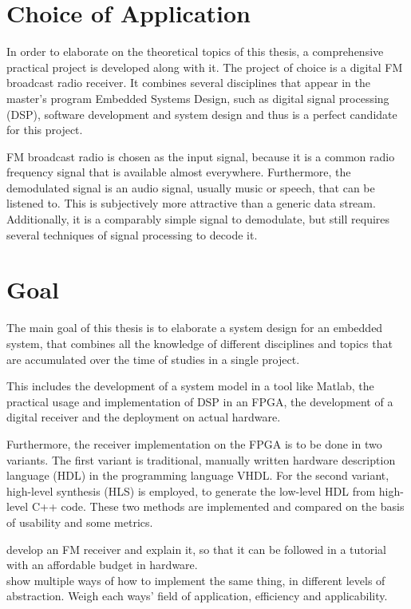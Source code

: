 \section{Choice of Application}

In order to elaborate on the theoretical topics of this thesis, a comprehensive practical project is developed along with it.
The project of choice is a digital FM broadcast radio receiver.
It combines several disciplines that appear in the master's program Embedded Systems Design, such as digital signal processing (DSP), software development and system design and thus is a perfect candidate for this project.

FM broadcast radio is chosen as the input signal, because it is a common radio frequency signal that is available almost everywhere.
Furthermore, the demodulated signal is an audio signal, usually music or speech, that can be listened to.
This is subjectively more attractive than a generic data stream.
Additionally, it is a comparably simple signal to demodulate, but still requires several techniques of signal processing to decode it.

\section{Goal}

The main goal of this thesis is to elaborate a system design for an embedded system, that combines all the knowledge of different disciplines and topics that are accumulated over the time of studies in a single project.

This includes the development of a system model in a tool like Matlab, the practical usage and implementation of DSP in an FPGA, the development of a digital receiver and the deployment on actual hardware.

Furthermore, the receiver implementation on the FPGA is to be done in two variants.
The first variant is traditional, manually written hardware description language (HDL) in the programming language VHDL.
For the second variant, high-level synthesis (HLS) is employed, to generate the low-level HDL from high-level C++ code.
These two methods are implemented and compared on the basis of usability and some metrics.

develop an FM receiver and explain it, so that it can be followed in a tutorial with an affordable budget in hardware.\\
show multiple ways of how to implement the same thing, in different levels of abstraction. Weigh each ways' field of application, efficiency and applicability.


